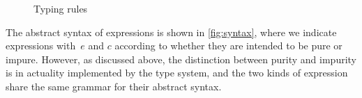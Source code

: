 \begin{figure}[htbp]
\begin{mdframed}
\begin{mathpar}






  \end{mathpar}
  \end{mdframed}
  \caption{Typing rules}
  \label{fig:typing-rules}
\end{figure}


The abstract syntax of expressions is shown in \cref{fig:syntax}, where we indicate expressions with~$e$ and $c$ according to whether they are intended to be pure or impure. However, as discussed above, the distinction between purity and impurity is in actuality implemented by the 
type system, and the two kinds of expression share the same grammar for their abstract syntax. 

